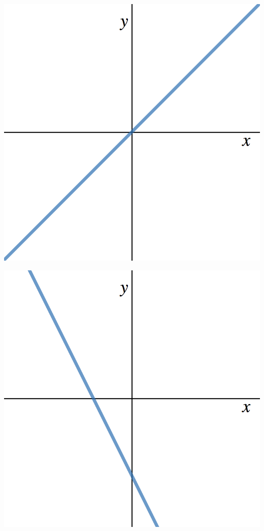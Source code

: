 \documentclass[11pt]{exam}
\theoremstyle{definition}
\begin{document}
\begin{questions}
\begin{enumerate}[(I)]
\begin{minipage}{.35\textwidth}
	\end{minipage}
	\begin{minipage}{.35\textwidth}
	\item \includegraphics[scale=0.1]{linearII.png}
	\end{minipage}
	\begin{minipage}{.35\textwidth}
	\item \includegraphics[scale=0.1]{linearIII.png}

\end{minipage}
\end{enumerate}
\end{questions}
\end{document}
